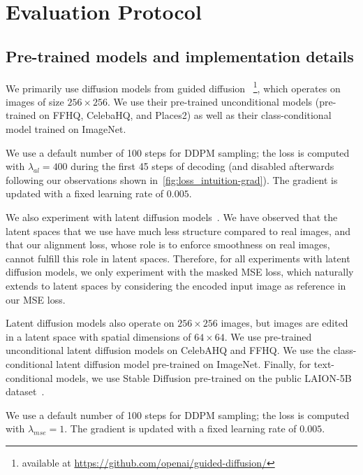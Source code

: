\section{Evaluation Protocol}



\subsection{Pre-trained models and implementation details} 

We primarily use diffusion models from guided diffusion~\citep{dhariwal2021diffusion} 
\footnote{available at \url{https://github.com/openai/guided-diffusion/}}, which operates on images of size $256\times256$. 
We use their pre-trained unconditional models (pre-trained on FFHQ, CelebaHQ, and Places2)  as well as their class-conditional model
trained on ImageNet. 

We use a default number of 100 steps for \ac{DDPM} 
sampling; the loss is computed with $\lambda_{al} =400$ during the first 45 steps of decoding (and disabled afterwards following 
our observations shown in~\ref{fig:loss_intuition-grad}). The gradient is updated with a fixed learning rate of $0.005$.



We also experiment with latent diffusion models~\citep{rombach2022high}.  We have observed that the latent spaces that we use have much
 less structure compared to real images, and that our alignment loss, whose role is to enforce smoothness on real images, 
 cannot fulfill this role in latent spaces. Therefore, for all experiments with latent diffusion models, we only experiment with 
 the masked MSE loss, which 
 naturally extends to latent spaces by considering the encoded input image as reference in our MSE loss.

Latent diffusion models also operate on $256\times256$ images, but images are
 edited in a latent space with spatial dimensions of $64\times64$.
 We use pre-trained unconditional latent diffusion models on CelebAHQ and FFHQ. We use the class-conditional 
 latent diffusion model pre-trained on ImageNet. Finally, for text-conditional models, we use Stable Diffusion pre-trained on the 
 public LAION-5B dataset~\citep{schuhmann2022laion}.

 We use a default number of 100 steps for DDPM sampling; the loss is computed with $\lambda_{mse} = 1$.
 The gradient is updated with a fixed learning rate of $0.005$.


